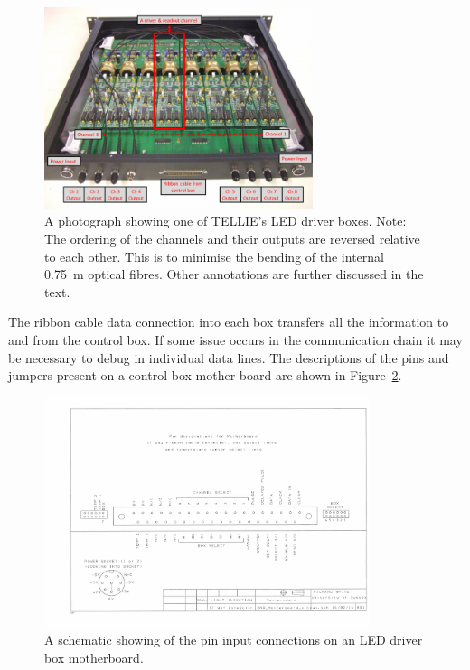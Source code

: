 \documentclass[12pt]{report}
\begin{document}
\begin{figure}[htbp]
	\begin{center}
		\includegraphics[width=0.7\textwidth]{DriverBoxAnnotated}
		\caption{A photograph showing one of TELLIE's LED driver boxes. Note: The ordering of the channels and their outputs are reversed relative to each other. This is to minimise the bending of the internal 0.75~m optical fibres. Other annotations are further discussed in the text.}
		\label{fig:DriverBoxAnnotated}
	\end{center}
\end{figure}

The ribbon cable data connection into each box transfers all the information to and from the control box. If some issue occurs in the communication chain it may be necessary to debug in individual data lines. The descriptions of the pins and jumpers present on a control box mother board are shown in Figure~\ref{fig:LEDBoxMotherboard}. 

\begin{figure}[htbp]
	\begin{center}
		\includegraphics[width=0.85\textwidth]{LEDBoxMotherboard}
		\caption{A schematic showing of the pin input connections on an LED driver box motherboard. }
		\label{fig:LEDBoxMotherboard}
	\end{center}
\end{figure}
\end{document}

